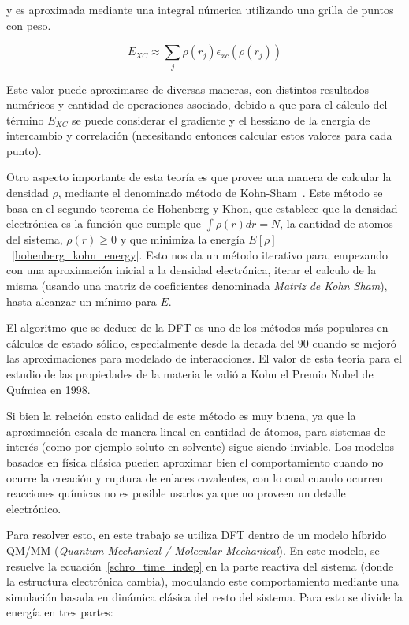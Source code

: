 y es aproximada mediante una integral n\'umerica utilizando una grilla de puntos con peso.

\begin{equation}
    \label{approx_excenergy}
    E_{XC} \approx \sum_j \rho(r_j) \epsilon_{xc} (\rho(r_j))
\end{equation}

Este valor puede aproximarse de diversas maneras, con distintos resultados num\'ericos y cantidad de operaciones
asociado, debido a que para el c\'alculo del t\'ermino $E_{XC}$ se puede considerar el gradiente
y el hessiano de la energ\'ia de intercambio y correlaci\'on (necesitando entonces calcular
estos valores para cada punto). 

Otro aspecto importante de esta teor\'ia es que provee una manera de calcular la densidad $\rho$,
mediante el denominado m\'etodo de Kohn-Sham~\cite{KohnSham}. Este m\'etodo se basa en el segundo teorema
de Hohenberg y Khon, que establece que la densidad electr\'onica es la funci\'on que
cumple que $\int \rho(r) dr = N$, la cantidad de atomos del sistema, $\rho(r) \geq 0$ y que
minimiza la energ\'ia $E[\rho]$~\ref{hohenberg_kohn_energy}. Esto nos da
un m\'etodo iterativo para, empezando con una aproximaci\'on inicial a la densidad electr\'onica,
iterar el calculo de la misma (usando una matriz de coeficientes denominada \textit{Matriz de Kohn Sham}), hasta
alcanzar un m\'inimo para $E$.

El algoritmo que se deduce de la DFT es uno de los m\'etodos m\'as populares en c\'alculos
de estado s\'olido, especialmente desde la decada del 90 cuando se mejor\'o las aproximaciones para modelado de
interacciones. El valor de esta teor\'ia para el estudio de las propiedades de la materia le vali\'o a Kohn el Premio Nobel
de Qu\'imica en 1998.

Si bien la relaci\'on costo calidad de este m\'etodo es muy buena, ya que la aproximaci\'on escala de manera lineal 
en cantidad de \'atomos, para sistemas de inter\'es (como por ejemplo soluto en solvente) sigue siendo inviable. Los
modelos basados en f\'isica cl\'asica pueden aproximar bien el comportamiento cuando no ocurre la creaci\'on y ruptura
de enlaces covalentes, con lo cual cuando ocurren reacciones qu\'imicas no es posible usarlos ya que no proveen un
detalle electr\'onico. 

Para resolver esto, en este trabajo se utiliza DFT dentro de un modelo h\'ibrido QM/MM (\textit{Quantum Mechanical / Molecular Mechanical}). 
En este modelo, se resuelve la ecuaci\'on~\ref{schro_time_indep} en la parte reactiva del sistema (donde la estructura
electr\'onica cambia), modulando este comportamiento mediante una simulaci\'on basada en din\'amica
cl\'asica del resto del sistema. Para esto se divide la energ\'ia en tres partes:

